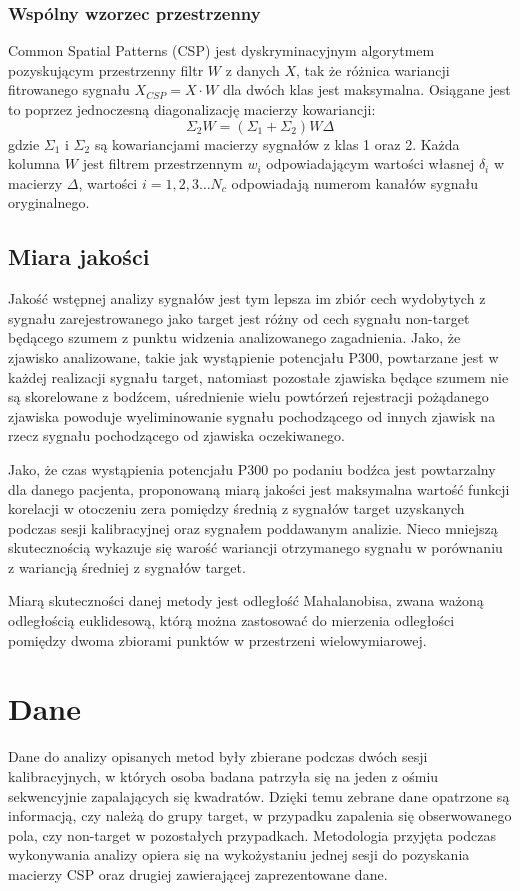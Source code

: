 \documentclass[licencjacka,openright]{pracamgr}
\begin{document}
\subsection{Wspólny wzorzec przestrzenny}
Common Spatial Patterns (CSP) jest dyskryminacyjnym algorytmem pozyskującym przestrzenny filtr $W$ z danych $X$, tak że różnica wariancji fitrowanego sygnału $X_{CSP} = X \cdot W$ dla dwóch klas jest maksymalna. Osiągane jest to poprzez jednoczesną diagonalizację macierzy kowariancji:
\begin{equation}
\Sigma _2 W = (\Sigma _1 + \Sigma _2 )W \Delta
\end{equation}
gdzie $\Sigma_1$ i $\Sigma_2$ są kowariancjami macierzy sygnałów z klas 1 oraz 2. Każda kolumna $W$ jest filtrem przestrzennym $w_i$ odpowiadającym wartości własnej $\delta _i$ w macierzy $\Delta$, wartości $i = 1,2,3 \ldots N_c$ odpowiadają numerom kanałów sygnału oryginalnego. \citep{sannelli2011}

\section{Miara jakości}
Jakość wstępnej analizy sygnałów jest tym lepsza im zbiór cech wydobytych z sygnału zarejestrowanego jako target jest różny od cech sygnału non-target będącego szumem z punktu widzenia analizowanego zagadnienia. Jako, że zjawisko analizowane, takie jak wystąpienie potencjału P300, powtarzane jest w każdej realizacji sygnału target, natomiast pozostałe zjawiska będące szumem nie są skorelowane z bodźcem, uśrednienie wielu powtórzeń rejestracji pożądanego zjawiska powoduje wyeliminowanie sygnału pochodzącego od innych zjawisk na rzecz sygnału pochodzącego od zjawiska oczekiwanego.

Jako, że czas wystąpienia potencjału P300 po podaniu bodźca jest powtarzalny dla danego pacjenta, proponowaną miarą jakości jest maksymalna wartość funkcji korelacji w otoczeniu zera pomiędzy średnią z sygnałów target uzyskanych podczas sesji kalibracyjnej oraz sygnałem poddawanym analizie. Nieco mniejszą skutecznością wykazuje się warość wariancji otrzymanego sygnału w porównaniu z wariancją średniej z sygnałów target.

Miarą skuteczności danej metody jest odległość Mahalanobisa, zwana ważoną odległością euklidesową, którą można zastosować do mierzenia odległości pomiędzy dwoma zbiorami punktów w przestrzeni wielowymiarowej.

\chapter{Dane}
Dane do analizy opisanych metod były zbierane podczas dwóch sesji kalibracyjnych, w których osoba badana patrzyła się na jeden z ośmiu sekwencyjnie zapalających się kwadratów. Dzięki temu zebrane dane opatrzone są informacją, czy należą do grupy target, w przypadku zapalenia się obserwowanego pola, czy non-target w pozostałych przypadkach. Metodologia przyjęta podczas wykonywania analizy opiera się na wykożystaniu jednej sesji do pozyskania macierzy CSP oraz drugiej zawierającej zaprezentowane dane.
\end{document}
